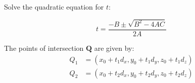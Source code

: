 \documentclass[12pt]{article}
\begin{document}
	Solve the quadratic equation for \( t \):
	
	
	\[
	t = \frac{-B \pm \sqrt{B^2 - 4AC}}{2A}
	\]
	
	
	
	The points of intersection \( \mathbf{Q} \) are given by:
	\begin{align*}
		Q_1 &= (x_0 + t_1 d_x, y_0 + t_1 d_y, z_0 + t_1 d_z) \\
		Q_2 &= (x_0 + t_2 d_x, y_0 + t_2 d_y, z_0 + t_2 d_z)
	\end{align*}
	
	
	
	
\end{document}
